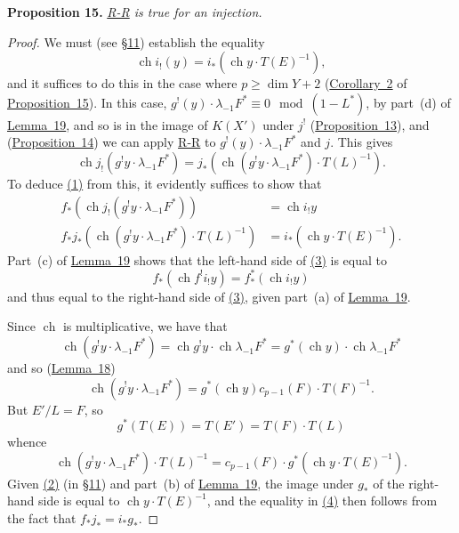 \documentclass{article}
\newenvironment{itenv}[1]
  {\phantomsection\par\medskip\noindent\textbf{#1.}\itshape}
  {\par\medskip}
\renewcommand{\geq}{\geqslant}
\DeclareMathOperator{\ch}{ch}
\newcommand{\oldpage}[1]{\marginpar{\footnotesize$\Big\vert$ \textit{p.~#1}}}
\begin{document}
\oldpage{129}
\begin{itenv}{Proposition 15}
\label{proposition15}
  \hyperref[theoremriemannroch]{R-R} is true for an injection.
\end{itenv}

\begin{proof}
  We must (see \hyperref[section11]{\S11}) establish the equality
  \[
  \label{proposition15equation1}
    \ch i_!(y) = i_*(\ch y\cdot T(E)^{-1}),
    \tag{1}
  \]
  and it suffices to do this in the case where $p\geq\dim Y+2$ (\hyperref[corollary2]{Corollary~2} of \hyperref[proposition15]{Proposition~15}).
  In this case, $g^!(y)\cdot\lambda_{-1}F^*\equiv0\mod(1-L^*)$, by part~(d) of \hyperref[lemma19]{Lemma~19}, and so is in the image of $K(X')$ under $j^!$ (\hyperref[proposition13]{Proposition~13}), and (\hyperref[proposition14]{Proposition~14}) we can apply \hyperref[theoremriemannroch]{R-R} to $g^!(y)\cdot\lambda_{-1}F^*$ and $j$.
  This gives
  \[
  \label{proposition15equation2}
    \ch j_!(g^! y\cdot\lambda_{-1}F^*)
    = j_*(\ch(g^! y\cdot \lambda_{-1}F^*)\cdot T(L)^{-1}).
    \tag{2}
  \]
  To deduce \hyperref[proposition15equation1]{(1)} from this, it evidently suffices to show that
  \begin{align*}
  \label{proposition15equation3}
    f_*(\ch j_!(g^!y\cdot\lambda_{-1}F^*)) &= \ch i_! y
    \tag{3}
  \\
  \label{proposition15equation4}f_*j_*(\ch(g^!y\cdot\lambda_{-1}F^*)\cdot T(L)^{-1}) &= i_*(\ch y\cdot T(E)^{-1}).
    \tag{4}
  \end{align*}
  Part~(c) of \hyperref[lemma19]{Lemma~19} shows that the left-hand side of \hyperref[proposition15equation3]{(3)} is equal to
  \[
    f_*(\ch f^!i_!y) = f_*^*(\ch i_!y)
  \]
  and thus equal to the right-hand side of \hyperref[proposition15equation3]{(3)}, given part~(a) of \hyperref[lemma19]{Lemma~19}.

  Since $\ch$ is multiplicative, we have that
  \[
    \ch(g^!y\cdot\lambda_{-1}F^*)
    = \ch g^!y\cdot\ch\lambda_{-1}F^*
    = g^*(\ch y)\cdot\ch\lambda_{-1}F^*
  \]
  and so (\hyperref[lemma18]{Lemma~18})
  \[
    \ch(g^!y\cdot\lambda_{-1}F^*) = g^*(\ch y)c_{p-1}(F)\cdot T(F)^{-1}.
  \]
  But $E'/L=F$, so
  \[
    g^*(T(E)) = T(E') = T(F)\cdot T(L)
  \]
  whence
  \[
    \ch(g^!y\cdot\lambda_{-1}F^*)\cdot T(L)^{-1} = c_{p-1}(F)\cdot g^*(\ch y\cdot T(E)^{-1}).
  \]
  Given \hyperref[section11equation2]{(2)} (in \hyperref[section11]{\S11}) and part~(b) of \hyperref[lemma19]{Lemma~19}, the image under $g_*$ of the right-hand side is equal to $\ch y\cdot T(E)^{-1}$, and the equality in \hyperref[proposition15equation4]{(4)} then follows from the fact that $f_*j_*=i_*g_*$.
\end{proof}
\end{document}
